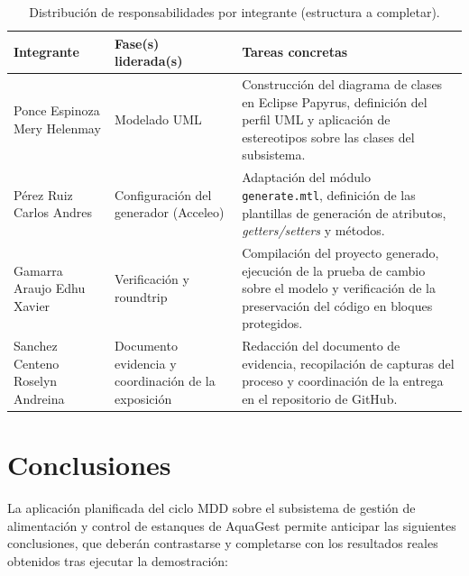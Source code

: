 \documentclass[11pt,a4paper]{article}
\begin{document}
\begin{table}[h!]
\centering
\small
\begin{tabular}{@{}L{3cm}L{4.5cm}L{4.5cm}@{}}
\toprule
\textbf{Integrante} & \textbf{Fase(s) liderada(s)} & \textbf{Tareas concretas} \\
\midrule
Ponce Espinoza Mery Helenmay & Modelado UML & Construcción del diagrama de clases en Eclipse Papyrus, definición del perfil UML y aplicación de estereotipos sobre las clases del subsistema. \\
Pérez Ruiz Carlos Andres & Configuración del generador (Acceleo) & Adaptación del módulo \texttt{generate.mtl}, definición de las plantillas de generación de atributos, \textit{getters/setters} y métodos. \\
Gamarra Araujo Edhu Xavier & Verificación y roundtrip & Compilación del proyecto generado, ejecución de la prueba de cambio sobre el modelo y verificación de la preservación del código en bloques protegidos. \\
Sanchez Centeno Roselyn Andreina & Documento evidencia y coordinación de la exposición & Redacción del documento de evidencia, recopilación de capturas del proceso y coordinación de la entrega en el repositorio de GitHub. \\
\bottomrule
\end{tabular}
\caption{Distribución de responsabilidades por integrante (estructura a completar).}
\end{table}

\section{Conclusiones}

La aplicación planificada del ciclo MDD sobre el subsistema de gestión de alimentación y control de
estanques de AquaGest permite anticipar las siguientes conclusiones, que deberán contrastarse y
completarse con los resultados reales obtenidos tras ejecutar la demostración:
\end{document}
